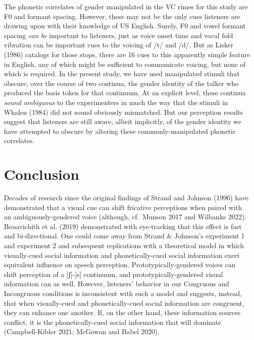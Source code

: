 \documentclass[
  letterpaper,
  DIV=11,
  numbers=noendperiod]{scrartcl}
\begin{document}
The phonetic correlates of gender manipulated in the VC rimes for this
study are F0 and formant spacing. However, these may not be the only
cues listeners are drawing upon with their knowledge of US English.
Surely, F0 and vowel formant spacing \emph{can be} important to
listeners, just as voice onset time and vocal fold vibration can be
important cues to the voicing of /t/ and /d/. But as Lisker (1986)
catalogs for those stops, there are 16 cues to this apparently simple
feature in English, any of which might be sufficient to communicate
voicing, but none of which is required. In the present study, we have
used manipulated stimuli that obscure, over the course of two continua,
the gender identity of the talker who produced the basis token for that
continuum. At an explicit level, these continua \emph{sound ambiguous}
to the experimenters in much the way that the stimuli in Whalen (1984)
did not sound obviously mismatched. But our perception results suggest
that listeners are still aware, albeit implicitly, of the gender
identity we have attempted to obscure by altering these
commonly-manipulated phonetic correlates.

\section{Conclusion}\label{conclusion}

Decades of research since the original findings of Strand and Johnson
(1996) have demonstrated that a visual cue can shift fricative
perceptions when paired with an ambiguously-gendered voice (although,
cf.~Munson 2017 and Wilbanks 2022). Bouavichith et al. (2019)
demonstrated with eye-tracking that this effect is fast and
bi-directional. One could come away from Strand \& Johnson's experiment
1 and experiment 2 and subsequent replications with a theoretical model
in which visually-cued social information and phonetically-cued social
information exert equivalent influence on speech perception.
Prototypically-gendered voices can shift perception of a {[}ʃ{]}-{[}s{]}
continuum, and prototypically-gendered visual information can as well.
However, listeners' behavior in our Congruous and Incongruous conditions
is inconsistent with such a model and suggests, instead, that when
visually-cued and phonetically-cued social information are congruent,
they can enhance one another. If, on the other hand, these information
sources conflict, it is the phonetically-cued social information that
will dominate (Campbell-Kibler 2021; McGowan and Babel 2020).
\end{document}
